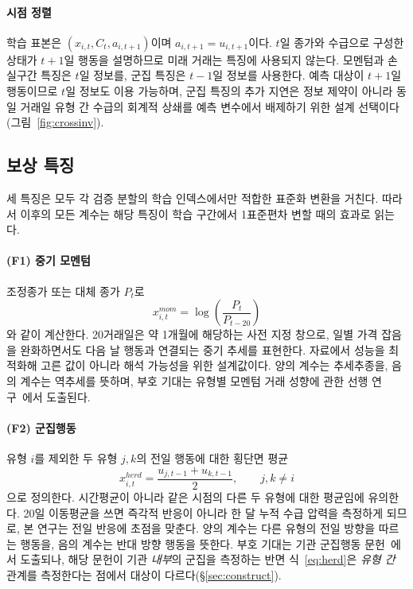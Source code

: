 \paragraph{시점 정렬}
학습 표본은 $(x_{i,t},C_t,a_{i,t+1})$이며 $a_{i,t+1}=u_{i,t+1}$이다. $t$일
종가와 수급으로 구성한 상태가 $t+1$일 행동을 설명하므로 미래 거래는 특징에
사용되지 않는다. 모멘텀과 손실구간 특징은 $t$일 정보를, 군집 특징은 $t-1$일
정보를 사용한다. 예측 대상이 $t+1$일 행동이므로 $t$일 정보도 이용 가능하며,
군집 특징의 추가 지연은 정보 제약이 아니라 동일 거래일 유형 간 수급의 회계적
상쇄를 예측 변수에서 배제하기 위한 설계 선택이다(그림~\ref{fig:crossinv}).

\subsection{보상 특징}
\label{sec:features}

세 특징은 모두 각 검증 분할의 학습 인덱스에서만 적합한 표준화 변환을 거친다.
따라서 이후의 모든 계수는 해당 특징이 학습 구간에서 1표준편차 변할 때의 효과로
읽는다.

\paragraph{(F1) 중기 모멘텀}
조정종가 또는 대체 종가 $P_t$로
\begin{equation}
x^{mom}_{i,t}=\log\!\left(\frac{P_t}{P_{t-20}}\right)
\label{eq:momentum}
\end{equation}
와 같이 계산한다. 20거래일은 약 1개월에 해당하는 사전 지정 창으로, 일별 가격
잡음을 완화하면서도 다음 날 행동과 연결되는 중기 추세를 표현한다. 자료에서
성능을 최적화해 고른 값이 아니라 해석 가능성을 위한 설계값이다. 양의 계수는
추세추종을, 음의 계수는 역추세를 뜻하며, 부호 기대는 유형별 모멘텀 거래
성향에 관한 선행 연구~\cite{grinblatt2000investment,choe1999foreign}에서
도출된다.

\paragraph{(F2) 군집행동}
유형 $i$를 제외한 두 유형 $j,k$의 전일 행동에 대한 횡단면 평균
\begin{equation}
x^{herd}_{i,t}=\frac{u_{j,t-1}+u_{k,t-1}}{2},\qquad j,k\neq i
\label{eq:herd}
\end{equation}
으로 정의한다. 시간평균이 아니라 같은 시점의 다른 두 유형에 대한 평균임에
유의한다. 20일 이동평균을 쓰면 즉각적 반응이 아니라 한 달 누적 수급 압력을
측정하게 되므로, 본 연구는 전일 반응에 초점을 맞춘다. 양의 계수는 다른 유형의
전일 방향을 따르는 행동을, 음의 계수는 반대 방향 행동을 뜻한다. 부호 기대는
기관 군집행동 문헌~\cite{lakonishok1992impact}에서 도출되나, 해당 문헌이 기관
\emph{내부}의 군집을 측정하는 반면 식~\eqref{eq:herd}은 \emph{유형 간} 관계를
측정한다는 점에서 대상이 다르다(\S\ref{sec:construct}).

